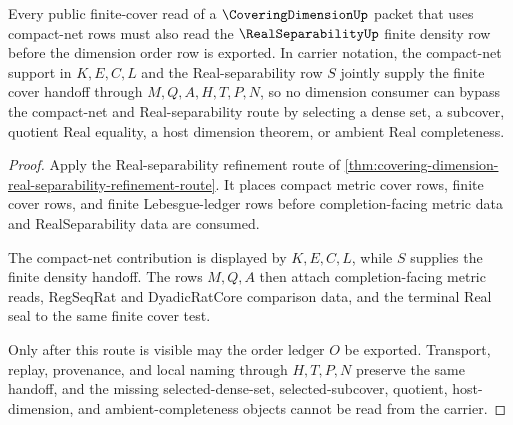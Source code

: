 \begin{theorem}
\label{thm:covering-dimension-compact-net-real-separability-handoff}
Every public finite-cover read of a $\CoveringDimensionUp$ packet that uses compact-net rows must also read the $\RealSeparabilityUp$ finite density row before the dimension order row is exported. In carrier notation, the compact-net support in $K,E,C,L$ and the Real-separability row $S$ jointly supply the finite cover handoff through $M,Q,A,H,T,P,N$, so no dimension consumer can bypass the compact-net and Real-separability route by selecting a dense set, a subcover, quotient Real equality, a host dimension theorem, or ambient Real completeness.
\end{theorem}
\begin{proof}
Apply the Real-separability refinement route of \autoref{thm:covering-dimension-real-separability-refinement-route}. It places compact metric cover rows, finite cover rows, and finite Lebesgue-ledger rows before completion-facing metric data and RealSeparability data are consumed.

The compact-net contribution is displayed by $K,E,C,L$, while $S$ supplies the finite density handoff. The rows $M,Q,A$ then attach completion-facing metric reads, RegSeqRat and DyadicRatCore comparison data, and the terminal Real seal to the same finite cover test.

Only after this route is visible may the order ledger $O$ be exported. Transport, replay, provenance, and local naming through $H,T,P,N$ preserve the same handoff, and the missing selected-dense-set, selected-subcover, quotient, host-dimension, and ambient-completeness objects cannot be read from the carrier.
\end{proof}
